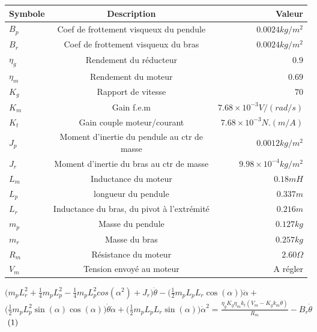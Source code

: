 \documentclass[12pt, a4paper, openany]{report}
\begin{document}
\begin{center}
\begin{tabular}{|l|c|r|}
\hline \rowcolor{mauve} Symbole & Description &  Valeur  \\
\hline $B_{p}$  &  Coef de frottement visqueux du pendule  & $0.0024 kg/m^{2}$   \\
\hline $B_{r}$ & Coef de frottement visqueux du bras & $0.0024 kg/m^{2}$ \\
\hline $\eta_{g}$  &  Rendement du réducteur  & $0.9$  \\
\hline $\eta_{m}$  &  Rendement du moteur  & $0.69$  \\
\hline $K_{g}$  &  Rapport de vitesse  & $70$  \\
\hline $K_{m}$  &  Gain f.e.m  & $7.68\times10^{-3} V/(rad/s)$ \\
\hline $K_{t}$  &  Gain couple moteur/courant  & $7.68\times10^{-3} N.(m/A)$\\
\hline $J_{p}$ &  Moment d'inertie du pendule au ctr de masse & $0.0012 kg/m^{2}$ \\
\hline $J_{r}$  &  Moment d'inertie du bras au ctr de masse  & $9.98\times10^{-4} kg/m^{2}$ \\
\hline $L_{m}$  &   Inductance du moteur & $0.18 mH$\\
\hline $L_{p}$  &  longueur du pendule  & $0.337 m$ \\
\hline $L_{r}$  &  Inductance du bras, du pivot à l'extrémité   & $0.216 m$ \\
\hline $m_{p}$  &  Masse du pendule  & $0.127 kg$\\
\hline $m_{r}$  &   Masse du bras  & $0.257 kg$\\
\hline $R_{m}$  &   Résistance du moteur  & $2.60 \Omega$ \\
\hline $V_{m}$  &  Tension envoyé au moteur   &  A régler \\

\hline 
\end{tabular}
\end{center} 

$\bigg(m_{p}L_{r}^{2} + \frac{1}{4}m_{p}L_{p}^{2} - \frac{1}{4}m_{p}L_{p}^{2}cos(\alpha^{2}) + J_{r} \bigg)\ddot{\theta}- \bigg(\frac{1}{2}m_{p}L_{p}L_{r}\cos(\alpha) \bigg)\ddot{\alpha}+$\\  $\bigg(\frac{1}{2}m_{p}L_{p}^{2}\sin(\alpha)\cos(\alpha) \bigg)\dot{\theta}\dot{\alpha} + \bigg(\frac{1}{2}m_{p}L_{p}L_{r}\sin(\alpha) \bigg)\dot{\alpha}^{2}=\frac{\eta_{g}K_{g}\eta_{m}k_{t}(V_{m}- K_{g}k_{m}\dot{\theta})}{R_{m}}-B_{r}\dot{\theta}$ $\hspace{1mm}(1)$ \\\\\\\\ 
\end{document}
